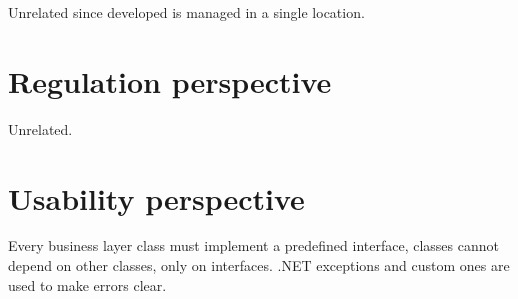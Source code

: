 Unrelated since developed is managed in a single location.

\section{Regulation perspective}

Unrelated.

\section{Usability perspective}

Every business layer class must implement a predefined interface, classes cannot depend on other classes, only on interfaces. .NET exceptions and custom ones are used to make errors clear. 
